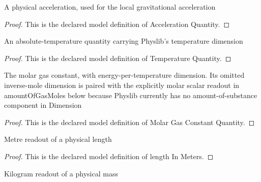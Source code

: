 \begin{definition}
  \label{def:physics:phyx-mini-0333:phyxminiproblems-problemphyxmini0333-accelerationquantity}
  A physical acceleration, used for the local gravitational acceleration
\end{definition}
\begin{proof}
  This is the declared model definition of Acceleration Quantity.
\end{proof}
\begin{definition}
  \label{def:physics:phyx-mini-0333:phyxminiproblems-problemphyxmini0333-temperaturequantity}
  An absolute-temperature quantity carrying Physlib's temperature dimension
\end{definition}
\begin{proof}
  This is the declared model definition of Temperature Quantity.
\end{proof}
\begin{definition}
  \label{def:physics:phyx-mini-0333:phyxminiproblems-problemphyxmini0333-molargasconstantquantity}
  The molar gas constant, with energy-per-temperature dimension. Its omitted inverse-mole dimension is paired with the explicitly molar scalar readout in amountOfGasMoles below because Physlib currently has no amount-of-substance component in Dimension
\end{definition}
\begin{proof}
  This is the declared model definition of Molar Gas Constant Quantity.
\end{proof}
\begin{definition}
  \label{def:physics:phyx-mini-0333:phyxminiproblems-problemphyxmini0333-lengthinmeters}
  Metre readout of a physical length
\end{definition}
\begin{proof}
  This is the declared model definition of length In Meters.
\end{proof}
\begin{definition}
  \label{def:physics:phyx-mini-0333:phyxminiproblems-problemphyxmini0333-massinkilograms}
  Kilogram readout of a physical mass
\end{definition}
